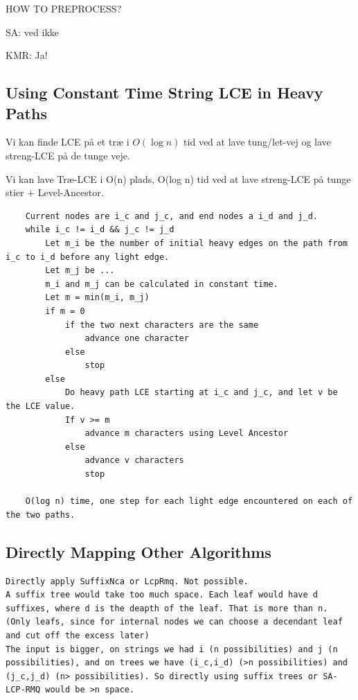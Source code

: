 \documentclass[a4]{article}
\begin{document}
HOW TO PREPROCESS?

SA: ved ikke

KMR: Ja!

\subsection{Using Constant Time String LCE in Heavy Paths}

Vi kan finde LCE på et træ i $O(\log n)$ tid ved at lave tung/let-vej og lave streng-LCE på de tunge veje.


Vi kan lave Træ-LCE i O(n) plads, O(log n) tid ved at lave streng-LCE på tunge stier + Level-Ancestor.

\begin{verbatim}
    Current nodes are i_c and j_c, and end nodes a i_d and j_d.
    while i_c != i_d && j_c != j_d
        Let m_i be the number of initial heavy edges on the path from i_c to i_d before any light edge.
        Let m_j be ...
        m_i and m_j can be calculated in constant time.
        Let m = min(m_i, m_j)
        if m = 0
            if the two next characters are the same
                advance one character
            else
                stop
        else
            Do heavy path LCE starting at i_c and j_c, and let v be the LCE value.
            If v >= m
                advance m characters using Level Ancestor
            else
                advance v characters
                stop

    O(log n) time, one step for each light edge encountered on each of the two paths.
\end{verbatim}

\subsection{Directly Mapping Other Algorithms}

\begin{verbatim}
Directly apply SuffixNca or LcpRmq. Not possible.
A suffix tree would take too much space. Each leaf would have d suffixes, where d is the deapth of the leaf. That is more than n. (Only leafs, since for internal nodes we can choose a decendant leaf and cut off the excess later)
The input is bigger, on strings we had i (n possibilities) and j (n possibilities), and on trees we have (i_c,i_d) (>n possibilities) and (j_c,j_d) (n> possibilities). So directly using suffix trees or SA-LCP-RMQ would be >n space.
\end{verbatim}
\end{document}
